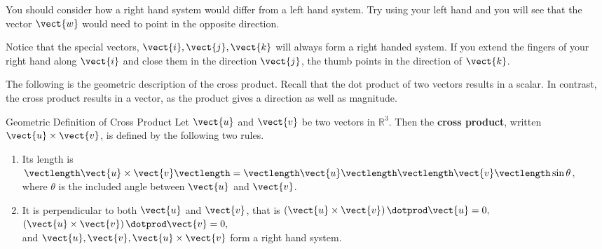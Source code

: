 You should consider how a right hand
system would differ from a left hand system. Try using your left hand and
you will see that the vector $\vect{w}$ would need to point in the
opposite direction.

Notice that the special vectors, $\vect{i},\vect{j},\vect{k}$ will always form a right handed
system. If you extend the fingers of your right hand along $\vect{i}$ and 
close them in the direction $\vect{j}$, the thumb points
in the direction of $\vect{k}$.

\begin{center}
\end{center}

The following is the geometric description of the cross product. Recall that the dot product of 
two vectors results in a scalar. In contrast, the cross product results in a vector, as the product gives
a direction as well as magnitude.

\begin{definition}{Geometric Definition of Cross Product}\label{def:crossprodgeomet}
Let $\vect{u}$ and $\vect{v}$ be two vectors in $\mathbb{R}^{3}.$ 
Then the \textbf{cross product}, written $\vect{u}\times \vect{v}$, is defined by
 the following two rules.

\begin{enumerate}
\item Its length is $\vectlength \vect{u}\times \vect{v}\vectlength =\vectlength \vect{u}\vectlength \vectlength
\vect{v}\vectlength \sin \theta $, \\
where $\theta $ is the included angle between $\vect{u}$ and $\vect{v}$.

\item It is perpendicular to both $\vect{u}$ and $\vect{v}$, that is $\left( \vect{u}\times \vect{v} \right) \dotprod \vect{u}=0,$ $\left( \vect{u}\times \vect{v} \right) \dotprod \vect{v}=0,$ \\
and  $\vect{u},\vect{v},\vect{u}\times \vect{v}$ form a right hand system.
\end{enumerate}
\end{definition}

